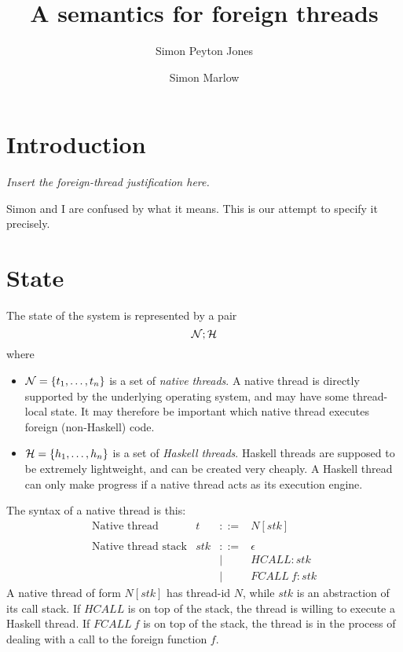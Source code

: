\documentclass{article}
\newcommand{\NS}{{\cal N}}
\newcommand{\HS}{{\cal H}}
\newcommand{\hcall}{HCALL}
\newcommand{\fcall}[1]{FCALL~#1}
\begin{document}
\title{A semantics for foreign threads}

\author{Simon Peyton Jones \and Simon Marlow}


\makeatactive

\section{Introduction}

\emph{Insert the foreign-thread justification here.}

Simon and I are confused by what it means. This is our attempt to specify it precisely.

\section{State}

The state of the system is represented by a pair
$$\NS ; \HS$$
where 
\begin{itemize}
\item $\NS = \{t_1, \ldots ,t_n\}$ is a set of \emph{native threads}.
A native thread is directly supported by the underlying operating
system, and may have some thread-local state. It may therefore
be important which native thread executes foreign
(non-Haskell) code.

\item $\HS = \{h_1, \ldots ,h_n\}$ is a set of \emph{Haskell threads}.
Haskell threads are supposed to be extremely lightweight, and
can be created very cheaply. A Haskell thread can only make progress
if a native thread acts as its execution engine.
\end{itemize}

The syntax of a native thread is this:
$$
\begin{array}{lrcl}
\mbox{Native thread} &  t & ::= & N[stk] \\
\\
\mbox{Native thread stack} &  stk & ::= & \epsilon \\
	& & | & \hcall : stk \\
	& & | & \fcall{f} : stk
\end{array}
$$
A native thread of form $N[stk]$ has thread-id $N$, while $stk$ is
an abstraction of its call stack.  If $\hcall$ is on top of the stack,
the thread is willing to execute a Haskell thread.  If $\fcall{f}$ is
on top of the stack, the thread is in the process of dealing with a call
to the foreign function $f$.  
\end{document}
